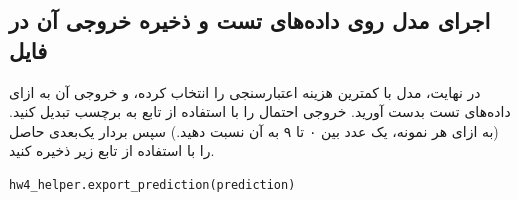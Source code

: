 \documentclass{article}
\begin{document}
\subsection*{اجرای مدل روی داده‌های تست و ذخیره خروجی آن در فایل}

در نهایت، مدل با کمترین هزینه اعتبارسنجی را انتخاب کرده، و خروجی آن به ازای داده‌های تست بدست آورید. خروجی احتمال را با استفاده از تابع
به برچسب تبدیل کنید. (به ازای هر نمونه،‌ یک عدد بین ۰ تا ۹ به آن نسبت دهید.) سپس بردار یک‌بعدی حاصل را با استفاده از تابع زیر ذخیره کنید.

\begin{latin}
\begin{lstlisting}[language=Python]
hw4_helper.export_prediction(prediction)
\end{lstlisting}
\end{latin}
\end{document}
